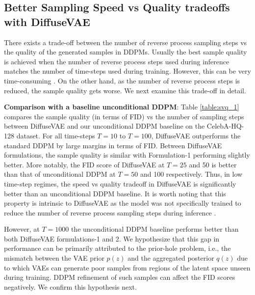 \documentclass[10pt]{article} \usepackage[accepted]{tmlr}
\newcommand{\remove}[1]{}
\begin{document}
\subsection{Better Sampling Speed vs Quality tradeoffs with DiffuseVAE}
\remove{The sample speed vs quality trade-off in DDPMs represents a trade-off between the number of reverse process sampling steps vs the quality of the generated samples.} There exists a trade-off between the number of reverse process sampling steps vs the quality of the generated samples in DDPMs. Usually the best sample quality is achieved when the number of reverse process steps used during inference matches the number of time-steps used during training. However, this can be very time-consuming \citep{song2021denoising}. On the other hand, as the number of reverse process steps is reduced, the sample quality gets worse. We next examine this trade-off in detail.

\textbf{Comparison with a baseline unconditional DDPM}: Table \ref{table:svq_1} compares the sample quality (in terms of FID) vs the number of sampling steps between DiffuseVAE and our unconditional DDPM baseline on the CelebA-HQ-128 dataset. For all time-steps $T=10$ to $T=100$, DiffuseVAE outperforms the standard DDPM by large margins in terms of FID. Between DiffuseVAE formulations, the sample quality is similar with Formulation-1 performing slightly better. More notably, the FID score of DiffuseVAE at $T=25$ and 50 is better than that of unconditional DDPM at $T=50$ and 100 respectively. Thus, in low time-step regimes, the speed vs quality tradeoff in DiffuseVAE is significantly better than an unconditional DDPM baseline. It is worth noting that this property is intrinsic to DiffuseVAE as the model was not specifically trained to reduce the number of reverse process sampling steps during inference \citep{salimans2022progressive}.

However, at $T=1000$ the unconditional DDPM baseline performs better than both DiffuseVAE formulations-1 and 2. We hypothesize that this gap in performance can be primarily attributed to the prior-hole problem, i.e., the mismatch between the VAE prior $p(z)$ and the aggregated posterior $q(z)$ \citep{BauMni18, dai2019diagnosing, Ghosh2020FromVT} due to which VAEs can generate poor samples from regions of the latent space unseen during training. DDPM refinement of such samples can affect the FID scores negatively. We confirm this hypothesis next.
\end{document}
